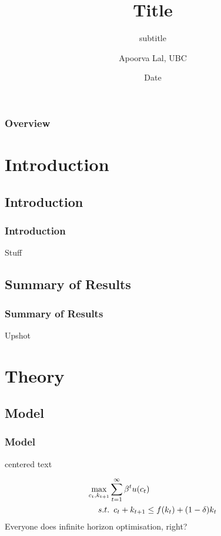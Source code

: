 \documentclass[11pt, aspectratio=169]{beamer}
\title{Title}
\subtitle{subtitle}
\author{Apoorva Lal, UBC}
\date{Date}
\begin{document}
\frame{\titlepage}
\begin{frame}
\frametitle{Overview}
\tableofcontents
\end{frame}
\section{Introduction}
\tableofcontents[currentsection,subsubsectionstyle=hide]
\subsection{Introduction}
\begin{frame}\frametitle{Introduction}
Stuff
\cite{AngristMostlyharmlesseconometrics2008b}
\end{frame}
\subsection{Summary of Results}
\begin{frame}[t]\frametitle{Summary of Results}
Upshot
\end{frame}

\section{Theory}
\tableofcontents[currentsection,subsubsectionstyle=hide]
\subsection{Model}
\begin{frame}[t]\frametitle{Model}
\begin{center}
centered text
\end{center}
\begin{align*}
\maximise_{c_t,k_{t+1}} &  \sum_{t=1}^{\infty} \beta^t u(c_t)  \\
  s.t. & \enspace c_{t} + k_{t+1} \leq f(k_t) + (1-\delta)k_t
\end{align*}
Everyone does infinite horizon optimisation, right?
\end{frame}
\end{document}

